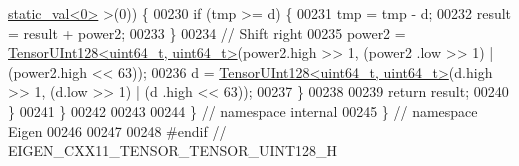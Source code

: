 \begin{DoxyCode}
      \hyperlink{struct_eigen_1_1internal_1_1static__val}{static\_val<0>} >(0)) \{
00230       \textcolor{keywordflow}{if} (tmp >= d) \{
00231         tmp = tmp - d;
00232         result = result + power2;
00233       \}
00234       \textcolor{comment}{// Shift right}
00235       power2 = \hyperlink{struct_eigen_1_1internal_1_1_tensor_u_int128}{TensorUInt128<uint64\_t, uint64\_t>}(power2.high >> 1, (power2
      .low >> 1) | (power2.high << 63));
00236       d = \hyperlink{struct_eigen_1_1internal_1_1_tensor_u_int128}{TensorUInt128<uint64\_t, uint64\_t>}(d.high >> 1, (d.low >> 1) | (d
      .high << 63));
00237     \}
00238 
00239     \textcolor{keywordflow}{return} result;
00240   \}
00241 \}
00242 
00243 
00244 \}  \textcolor{comment}{// namespace internal}
00245 \}  \textcolor{comment}{// namespace Eigen}
00246 
00247 
00248 \textcolor{preprocessor}{#endif  // EIGEN\_CXX11\_TENSOR\_TENSOR\_UINT128\_H}
\end{DoxyCode}
